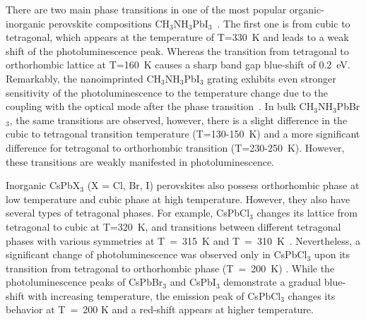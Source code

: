 \documentclass[journal=chreay,manuscript=review]{achemso}
\begin{document}
There are two main phase transitions in one of the most popular organic-inorganic perovskite compositions CH$_3$NH$_3$PbI$_3$~\cite{whitfield2016structures}. The first one is from cubic to tetragonal, which appears at the temperature of T=330~K and leads to a weak shift of the photoluminescence peak. Whereas the transition from tetragonal to orthorhombic lattice at T=160~K causes a sharp band gap blue-shift of 0.2~eV. Remarkably, the nanoimprinted CH$_3$NH$_3$PbI$_3$ grating exhibits even stronger sensitivity of the photoluminescence to the temperature change due to the coupling with the optical mode after the phase transition~\cite{tiguntseva2019enhanced}. In bulk CH$_3$NH$_3$PbBr$_3$, the same transitions are observed, however, there is a slight difference in the cubic to tetragonal transition temperature (T=130-150~K) and a more significant difference for tetragonal to orthorhombic transition (T=230-250~K)\cite{liu2018temperature}. However, these transitions are weakly manifested in photoluminescence.

Inorganic CsPbX$_3$ (X = Cl, Br, I) perovskites also possess orthorhombic phase at low temperature and cubic phase at high temperature. However, they also have several types of tetragonal phases\cite{hirotsu1971experimental, hirotsu1978elastic, tovborg1969nqr}.
For example, CsPbCl$_3$ changes its lattice from tetragonal to cubic at T=320~K, and transitions between different tetragonal phases with various symmetries at T~=~315~K and T~=~310~K~\cite{hiraoka2005observations}. Nevertheless, a significant change of photoluminescence was observed only in CsPbCl$_3$ upon its transition from tetragonal to orthorhombic phase (T~=~200~K) \citep{yi2020correlation}. While the photoluminescence peaks of CsPbBr$_3$ and CsPbI$_3$ demonstrate a gradual blue-shift with increasing temperature, the emission peak of CsPbCl$_3$ changes its behavior at T~=~200 K and a red-shift appears at higher temperature.
\end{document}
